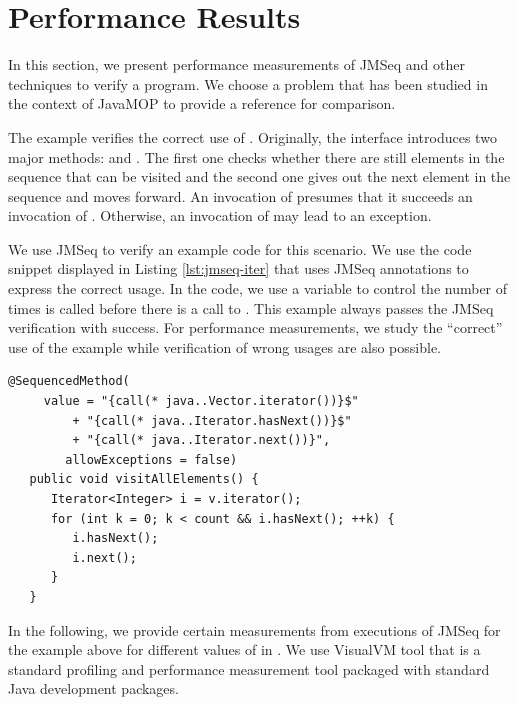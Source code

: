 \section{Performance Results} \label{sec:results}

In this section, we present performance measurements of JMSeq and other techniques to verify a program.
We choose a problem that has been studied in the context of JavaMOP \cite{chen_rosu_jmop} to provide a reference for comparison.

The example verifies the correct use of .
Originally, the interface introduces two major methods:  and . 
The first one checks whether there are still elements in the sequence that can be visited and the second one gives out the next element in the sequence and moves forward.
An invocation of  presumes that it succeeds an invocation of .
Otherwise, an invocation of  may lead to an exception.

We use JMSeq to verify an example code for this scenario. 
We use the code snippet displayed in Listing \ref{lst:jmseq-iter} that uses JMSeq annotations to express the correct usage. 
In the code, we use a variable  to control the number of times  is called before there is a call to . 
This example always passes the JMSeq verification with success. 
For performance measurements, we study the ``correct'' use of the example while verification of wrong usages are also possible. 
\lstset{language=Java}
\begin{lstlisting}[label=lst:jmseq-iter, caption=Iterator usage with
JMSeq Annotations]
   @SequencedMethod(
     value = "{call(* java..Vector.iterator())}$"
         + "{call(* java..Iterator.hasNext())}$"
         + "{call(* java..Iterator.next())}", 
        allowExceptions = false)
   public void visitAllElements() {
      Iterator<Integer> i = v.iterator();
      for (int k = 0; k < count && i.hasNext(); ++k) {
         i.hasNext();
         i.next();
      }
   }
\end{lstlisting}

In the following, we provide certain measurements from executions of JMSeq for the example above for different values of  in . 
We use VisualVM tool that is a standard profiling and performance measurement tool packaged with standard Java development packages.

